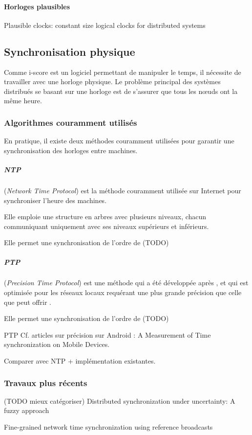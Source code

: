 \paragraph{Horloges plausibles}
Plausible clocks: constant size logical clocks for distributed systems

\subsection{Synchronisation physique}
Comme i-score est un logiciel permettant de manipuler le temps, il nécessite de travailler avec une horloge physique. Le problème principal des systèmes distribués se basant sur une horloge est de s'assurer que tous les nœuds ont la même heure.

\subsubsection{Algorithmes couramment utilisés}
En pratique, il existe deux méthodes couramment utilisées pour garantir une synchronisation des horloges entre machines.

\subparagraph{NTP} (\textit{Network Time Protocol}) est la méthode couramment utilisée sur Internet pour synchroniser l'heure des machines.

Elle emploie une structure en arbres avec plusieurs niveaux, chacun communiquant uniquement avec ses niveaux supérieurs et inférieurs.

Elle permet une synchronisation de l'ordre de (TODO)
\subparagraph{PTP} (\textit{Precision Time Protocol}) est une méthode qui a été développée après , et qui est optimisée pour les réseaux locaux requérant une plus grande précision que celle que peut offrir .

Elle permet une synchronisation de l'ordre de (TODO)

\ac{PTP}
Cf. articles sur précision sur Android : 
A Measurement of Time synchronization on Mobile Devices.

Comparer avec NTP + implémentation existantes.

\subsubsection{Travaux plus récents}
(TODO mieux catégoriser)
Distributed synchronization under uncertainty: A fuzzy approach

Fine-grained network time synchronization using reference broadcasts


